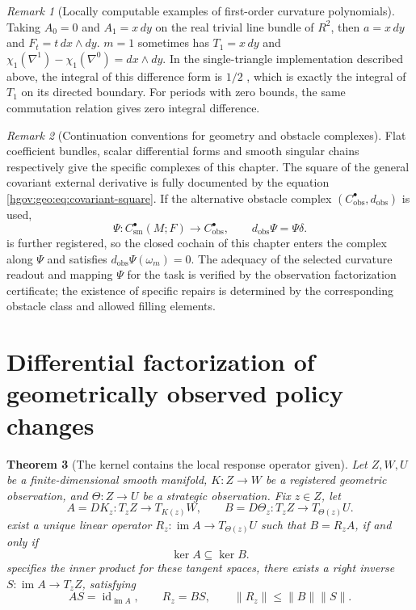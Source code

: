 \documentclass[12pt,a4paper,openany,notitlepage]{report}
\theoremstyle{plain}
\newtheorem{theorem}{Theorem}[chapter]
\theoremstyle{definition}
\theoremstyle{remark}
\newtheorem{remark}[theorem]{Remark}
\def\mathcal#1{#1}\def\mathsf#1{#1}\def\mathbb#1{#1}%
\begin{document}
\begin{CJK*}
\begin{remark}
[Locally computable examples of first-order curvature polynomials]Taking $A_0=0$ and $A_1=x\,dy$ on the real trivial line bundle of $\mathbb R^2$, then $a=x\,dy$ and $F_t=t\,dx\wedge dy$. $m=1$ sometimes has $\mathsf T_1=x\,dy$ and $\chi_1(\nabla^1)-\chi_1(\nabla^0)=dx\wedge dy$. In the single-triangle implementation described above, the integral of this difference form is $1/2$ , which is exactly the integral of $\mathsf T_1$ on its directed boundary. For periods with zero bounds, the same commutation relation gives zero integral difference.\end{remark}


\begin{remark}
[Continuation conventions for geometry and obstacle complexes]Flat coefficient bundles, scalar differential forms and smooth singular chains respectively give the specific complexes of this chapter. The square of the general covariant external derivative is fully documented by the equation ~ \eqref{hgov:geo:eq:covariant-square}. If the alternative obstacle complex $(C_{\mathrm{obs}}^\bullet,d_{\mathrm{obs}})$ is used, \[
\Psi:C_{\mathrm{sm}}^\bullet(M;\mathbb F)
\longrightarrow C_{\mathrm{obs}}^\bullet,
\qquad d_{\mathrm{obs}}\Psi=\Psi\delta.
\] is further registered, so the closed cochain of this chapter enters the complex along $\Psi$ and satisfies $d_{\mathrm{obs}}\Psi(\omega_m)=0$. The adequacy of the selected curvature readout and mapping $\Psi$ for the task is verified by the observation factorization certificate; the existence of specific repairs is determined by the corresponding obstacle class and allowed filling elements.\end{remark}


\section { Differential factorization of geometrically observed policy changes }\label{hgov:geo:response}


\begin{theorem}
[The kernel contains the local response operator given]\label{hgov:geo:thm:factor}
Let $\mathcal Z,\mathcal W,\mathcal U$ be a finite-dimensional smooth manifold, $\mathcal K:\mathcal Z\to\mathcal W$ be a registered geometric observation, and $\Theta:\mathcal Z\to\mathcal U$ be a strategic observation. Fix $z\in\mathcal Z$, let \[
A=D\mathcal K_z:T_z\mathcal Z\to T_{\mathcal K(z)}\mathcal W,
\qquad
B=D\Theta_z:T_z\mathcal Z\to T_{\Theta(z)}\mathcal U.
\] exist a unique linear operator $\mathcal R_z:\operatorname{im}A\to T_{\Theta(z)}\mathcal U$ such that $B=\mathcal R_zA$, if and only if \begin{equation}
\label{hgov:geo:eq:kernel}
\ker A\subseteq\ker B.
\end{equation} specifies the inner product for these tangent spaces, there exists a right inverse $S:\operatorname{im}A\to T_z\mathcal Z$, satisfying \[
AS=\operatorname{id}_{\operatorname{im}A},\qquad
\mathcal R_z=BS,\qquad
\lVert\mathcal R_z\rVert\le\lVert B\rVert\lVert S\rVert.
\]\end{theorem}



\end{CJK*}
\end{document}
